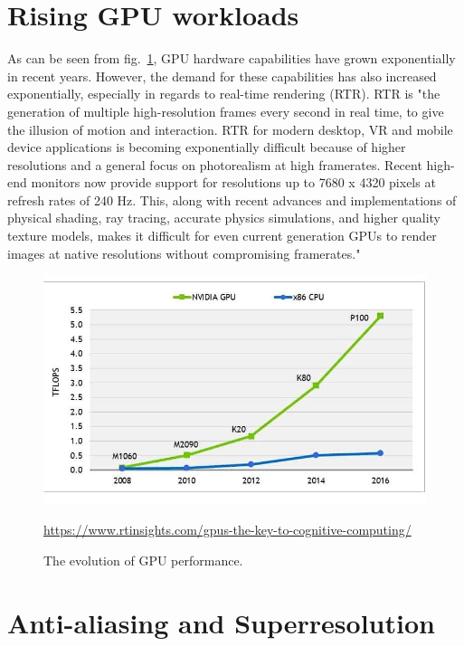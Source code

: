 \documentclass[10pt,twoside,english,a4paper]{article}
\begin{document}
\section{Rising GPU workloads} \label{rise}

As can be seen from fig.~\ref{f:graph}, GPU hardware capabilities have grown exponentially in recent years. However, the demand for these capabilities has also increased exponentially, especially in regards to real-time rendering (RTR). RTR is "the generation of multiple high-resolution frames every second in real time, to give the illusion of motion and interaction. RTR for modern desktop, VR and mobile device applications is becoming exponentially difficult because of higher resolutions and a general focus on photorealism at high framerates. Recent high-end monitors now provide support for resolutions up to 7680 x 4320 pixels at refresh rates of 240 Hz. This, along with recent advances and implementations of physical shading, ray tracing, accurate physics simulations, and higher quality texture models, makes it difficult for even current generation GPUs to render images at native resolutions without compromising framerates."\cite{9441822}

\begin{figure}[tbh]
\centering
\includegraphics[scale=0.4]{gpugraph.jpg}
\caption{The evolution of GPU performance.}
\url{https://www.rtinsights.com/gpus-the-key-to-cognitive-computing/}
\label{f:graph}
\end{figure}



\section{Anti-aliasing and Superresolution} \label{aasr}
\end{document}
